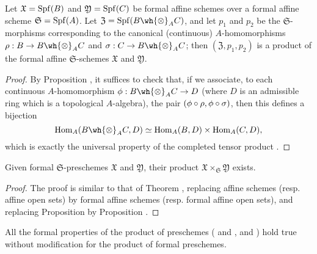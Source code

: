 \begin{prop}[10.7.2]
\label{1.10.7.2}
Let $\mathfrak{X}=\operatorname{Spf}(B)$ and $\mathfrak{Y}=\operatorname{Spf}(C)$ be formal affine schemes over a formal affine scheme $\mathfrak{S}=\operatorname{Spf}(A)$.
Let $\mathfrak{Z}=\Spf(B\wh{\otimes}_A C)$, and let $p_1$ and $p_2$ be the $\mathfrak{S}$-morphisms corresponding  to the canonical (continuous) $A$-homomorphisms $\rho: B\to B\wh{\otimes}_A C$ and $\sigma:C\to B\wh{\otimes}_A C$; then $(\mathfrak{Z},p_1,p_2)$ is a product of the formal affine $\mathfrak{S}$-schemes $\mathfrak{X}$ and $\mathfrak{Y}$.
\end{prop}

\begin{proof}
\label{proof-1.10.7.2}
By Proposition , it suffices to check that, if we associate, to each continuous $A$-homomorphism $\vphi:B\wh{\otimes}_A C\to D$ (where $D$ is an admissible ring which is a topological $A$-algebra), the pair $(\phi\circ\rho,\phi\circ\sigma)$, then this defines a bijection
\[
  \Hom_A(B\wh{\otimes}_A C,D)\isoto\Hom_A(B,D)\times\Hom_A(C,D),
\]
which is exactly the universal property of the completed tensor product .
\end{proof}

\begin{prop}[10.7.3]
\label{1.10.7.3}
Given formal $\mathfrak{S}$-preschemes $\mathfrak{X}$ and $\mathfrak{Y}$, their product $\mathfrak{X}\times_\mathfrak{S}\mathfrak{Y}$ exists.
\end{prop}

\begin{proof}
\label{proof-1.10.7.3}
The proof is similar to that of Theorem , replacing affine schemes (resp. affine open sets) by formal affine schemes (resp. formal affine open sets), and replacing Proposition  by Proposition .
\end{proof}

All the formal properties of the product of preschemes ( and ,  and ) hold true without modification for the product of formal preschemes.

